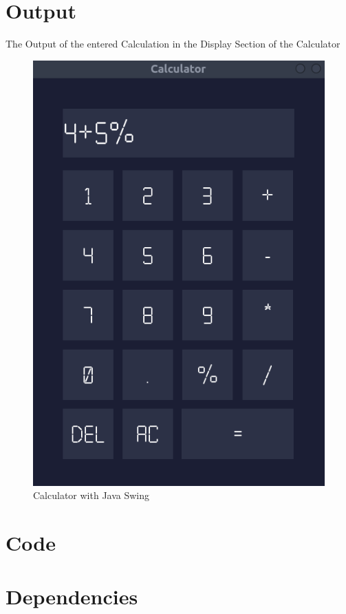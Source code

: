 \documentclass[11pt]{article}
\begin{document}
\section{Output}
The Output of the entered Calculation in the Display Section of the Calculator
\begin{figure}[H]
	\centering
	\includegraphics[scale=0.5]{Calculator.png}
	\caption{Calculator with Java Swing}
\end{figure}

\section{Code}



\section{Dependencies}

	
\end{document}
